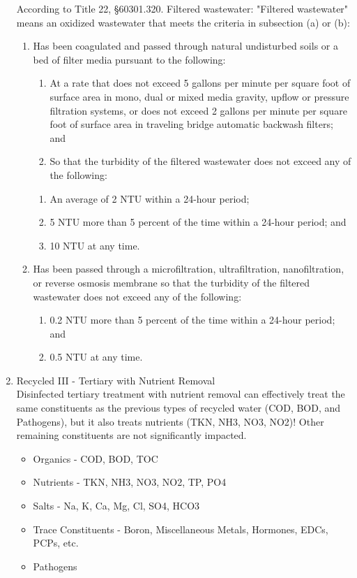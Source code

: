 \begin{enumerate}
According to Title 22, §60301.320. Filtered wastewater:
"Filtered wastewater" means an oxidized wastewater that meets the criteria in subsection (a) or (b):
\begin{enumerate}
\item Has been coagulated and passed through natural undisturbed soils or a bed of filter media pursuant to the following:
\begin{enumerate}
\item At a rate that does not exceed 5 gallons per minute per square foot of surface area in mono, dual or mixed media gravity, upflow or pressure filtration systems, or does not exceed 2 gallons per minute per square foot of surface area in traveling bridge automatic backwash filters; and
\item So that the turbidity of the filtered wastewater does not exceed any of the following:
\end{enumerate}
\begin{enumerate}
\item An average of 2 NTU within a 24-hour period;
\item 5 NTU more than 5 percent of the time within a 24-hour period; and
\item 10 NTU at any time.
\end{enumerate}
\item Has been passed through a microfiltration, ultrafiltration, nanofiltration, or reverse osmosis membrane so that the turbidity of the filtered wastewater does not exceed any of the following:
\begin{enumerate}
\item 0.2 NTU more than 5 percent of the time within a 24-hour period; and
\item 0.5 NTU at any time.
\end{enumerate}
\end{enumerate}

\item Recycled III - Tertiary with Nutrient Removal\\

Disinfected tertiary treatment with nutrient removal can effectively treat the same constituents as the previous types of recycled water (COD, BOD, and Pathogens), but it also treats nutrients (TKN, NH3, NO3, NO2)!  Other remaining constituents are not significantly impacted.
\begin{itemize}
\item Organics - COD, BOD, TOC
\item Nutrients - TKN, NH3, NO3, NO2, TP, PO4
\item Salts - Na, K, Ca, Mg, Cl, SO4, HCO3
\item Trace Constituents - Boron, Miscellaneous Metals, Hormones, EDCs, PCPs, etc.
\item Pathogens
\end{itemize}


\end{enumerate}
